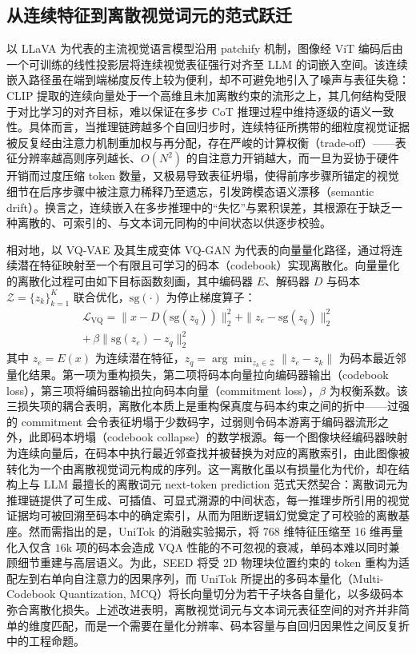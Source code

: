 \documentclass[twocolumn]{ctexart}
\newcommand{\vqgan}{VQ-GAN}
\begin{document}
\subsection{从连续特征到离散视觉词元的范式跃迁}\label{sec:vt:contdisc}
以 LLaVA\cite{liu2024univl} 为代表的主流视觉语言模型沿用 patchify 机制，图像经 ViT 编码后由一个可训练的线性投影层将连续视觉表征强行对齐至 LLM 的词嵌入空间。该连续嵌入路径虽在端到端梯度反传上较为便利，却不可避免地引入了噪声与表征失稳：CLIP\cite{radford2021clip} 提取的连续向量处于一个高维且未加离散约束的流形之上，其几何结构受限于对比学习的对齐目标，难以保证在多步 CoT 推理过程中维持逐级的语义一致性。具体而言，当推理链跨越多个自回归步时，连续特征所携带的细粒度视觉证据被反复经由注意力机制重加权与再分配，存在严峻的计算权衡（trade-off）——表征分辨率越高则序列越长、$O(N^{2})$ 的自注意力开销越大，而一旦为妥协于硬件开销而过度压缩 token 数量，又极易导致表征坍塌，使得前序步骤所锚定的视觉细节在后序步骤中被注意力稀释乃至遗忘，引发跨模态语义漂移（semantic drift）。换言之，连续嵌入在多步推理中的“失忆”与累积误差，其根源在于缺乏一种离散的、可索引的、与文本词元同构的中间状态以供逐步校验。

相对地，以 VQ-VAE\cite{van2017vqvae} 及其生成变体 \vqgan{}\cite{esser2021vqgan} 为代表的向量量化路径，通过将连续潜在特征映射至一个有限且可学习的码本（codebook）实现离散化。向量量化的离散化过程可由如下目标函数刻画，其中编码器 $E$、解码器 $D$ 与码本 $\mathcal{Z}=\{z_k\}_{k=1}^{K}$ 联合优化，$\text{sg}(\cdot)$ 为停止梯度算子：
\begin{multline}\label{eq:vq}
\mathcal{L}_{\text{VQ}}=\|x-D(\text{sg}(z_{q}))\|_{2}^{2}+\|z_{e}-\text{sg}(z_{q})\|_{2}^{2} \\
+\,\beta\|\text{sg}(z_{e})-z_{q}\|_{2}^{2}
\end{multline}
其中 $z_{e}=E(x)$ 为连续潜在特征，$z_{q}=\arg\min_{z_k\in\mathcal{Z}}\|z_{e}-z_k\|$ 为码本最近邻量化结果。第一项为重构损失，第二项将码本向量拉向编码器输出（codebook loss），第三项将编码器输出拉向码本向量（commitment loss），$\beta$ 为权衡系数。该三损失项的耦合表明，离散化本质上是重构保真度与码本约束之间的折中——过强的 commitment 会令表征坍塌于少数码字，过弱则令码本游离于编码器流形之外，此即码本坍塌（codebook collapse）的数学根源。每一个图像块经编码器映射为连续向量后，在码本中执行最近邻查找并被替换为对应的离散索引，由此图像被转化为一个由离散视觉词元构成的序列。这一离散化虽以有损量化为代价，却在结构上与 LLM 最擅长的离散词元 next-token prediction 范式天然契合：离散词元为推理链提供了可生成、可插值、可显式溯源的中间状态，每一推理步所引用的视觉证据均可被回溯至码本中的确定索引，从而为阻断逻辑幻觉奠定了可校验的离散基座。然而需指出的是，UniTok\cite{fei2025unitok} 的消融实验揭示，将 768 维特征压缩至 16 维再量化入仅含 $16\text{k}$ 项的码本会造成 VQA 性能的不可忽视的衰减，单码本难以同时兼顾细节重建与高层语义。为此，SEED\cite{ge2023seed} 将受 2D 物理块位置约束的 token 重构为适配左到右单向自注意力的因果序列，而 UniTok 所提出的多码本量化（Multi-Codebook Quantization, MCQ）将长向量切分为若干子块各自量化，以多级码本弥合离散化损失。上述改进表明，离散视觉词元与文本词元表征空间的对齐并非简单的维度匹配，而是一个需要在量化分辨率、码本容量与自回归因果性之间反复折中的工程命题。
\end{document}
